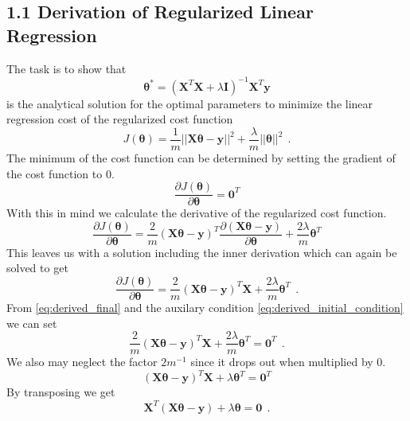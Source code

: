 \subsection{1.1 Derivation of Regularized Linear Regression}
\label{subsec:task_1_1}

The task is to show that
\begin{equation}\label{eq:parameters_target}
 \bm\theta^* = (\bm X^T\bm X+\lambda \bm I)^{-1}\bm X^T\bm y
\end{equation}
is the analytical solution for the optimal parameters to minimize the linear regression cost of the regularized cost function
\begin{equation}
 J(\bm\theta) = \frac{1}{m}||\bm X\bm\theta-\bm y||^2 + \frac{\lambda}{m}||\bm\theta||^2~~.
\end{equation}
The minimum of the cost function can be determined by setting the gradient of the cost function to 0.
\begin{equation}\label{eq:derived_initial_condition}
 \frac{\partial J(\bm\theta)}{\partial\bm\theta} = \bm 0^T
\end{equation}
With this in mind we calculate the derivative of the regularized cost function.
\begin{equation}
 \frac{\partial J(\bm\theta)}{\partial\bm\theta} = \frac{2}{m}(\bm X\bm\theta-\bm y)^T\frac{\partial(\bm X\bm\theta-\bm y)}{\partial\bm\theta}+\frac{2\lambda}{m}\bm\theta^T
\end{equation}
This leaves us with a solution including the inner derivation which can again be solved to get
\begin{equation}\label{eq:derived_final}
 \frac{\partial J(\bm\theta)}{\partial\bm\theta} = \frac{2}{m}(\bm X\bm\theta-\bm y)^T\bm X+\frac{2\lambda}{m}\bm\theta^T~~.
\end{equation}
From \eqref{eq:derived_final} and the auxilary condition \eqref{eq:derived_initial_condition} we can set 
\begin{equation}
 \frac{2}{m}(\bm X\bm\theta-\bm y)^T\bm X+\frac{2\lambda}{m}\bm\theta^T=\bm 0^T~~.
\end{equation}
We also may neglect the factor $2m^{-1}$ since it drops out when multiplied by 0.
\begin{equation}
(\bm X\bm\theta-\bm y)^T\bm X+\lambda\bm\theta^T=\bm 0^T
\end{equation}
By transposing we get
\begin{equation}
\bm X^T(\bm X\bm\theta-\bm y)+\lambda\bm\theta=\bm 0~~.
\end{equation}
